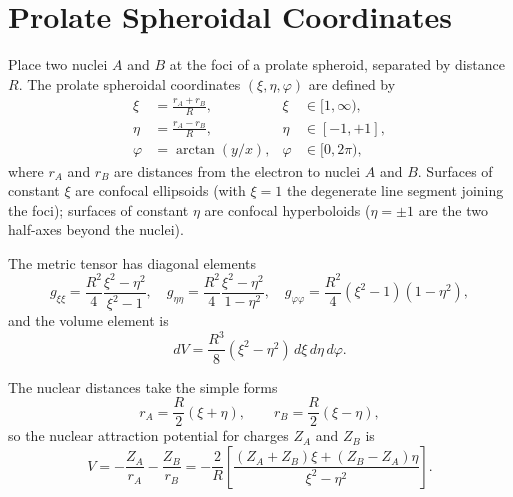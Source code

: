 \documentclass[aps,pra,twocolumn,superscriptaddress,longbibliography]{revtex4-2}
\begin{document}

\section{Prolate Spheroidal Coordinates}
\label{sec:coords}

Place two nuclei $A$ and $B$ at the foci of a prolate spheroid,
separated by distance $R$.  The prolate spheroidal coordinates
$(\xi, \eta, \varphi)$ are defined by
\begin{align}
  \xi  &= \frac{r_A + r_B}{R}, & \xi &\in [1, \infty), \label{eq:xi_def} \\
  \eta &= \frac{r_A - r_B}{R}, & \eta &\in [-1, +1], \label{eq:eta_def} \\
  \varphi &= \arctan(y/x),     & \varphi &\in [0, 2\pi), \label{eq:phi_def}
\end{align}
where $r_A$ and $r_B$ are distances from the electron to nuclei $A$
and $B$.  Surfaces of constant $\xi$ are confocal ellipsoids (with
$\xi = 1$ the degenerate line segment joining the foci); surfaces
of constant $\eta$ are confocal hyperboloids ($\eta = \pm 1$ are
the two half-axes beyond the nuclei).

The metric tensor has diagonal elements
\begin{equation}
  g_{\xi\xi} = \frac{R^2}{4} \frac{\xi^2 - \eta^2}{\xi^2 - 1},
  \quad
  g_{\eta\eta} = \frac{R^2}{4} \frac{\xi^2 - \eta^2}{1 - \eta^2},
  \quad
  g_{\varphi\varphi} = \frac{R^2}{4}(\xi^2 - 1)(1 - \eta^2),
  \label{eq:metric}
\end{equation}
and the volume element is
\begin{equation}
  dV = \frac{R^3}{8}(\xi^2 - \eta^2)\,d\xi\,d\eta\,d\varphi.
  \label{eq:volume}
\end{equation}

The nuclear distances take the simple forms
\begin{equation}
  r_A = \frac{R}{2}(\xi + \eta), \qquad
  r_B = \frac{R}{2}(\xi - \eta),
  \label{eq:nuclear_distances}
\end{equation}
so the nuclear attraction potential for charges $Z_A$ and $Z_B$ is
\begin{equation}
  V = -\frac{Z_A}{r_A} - \frac{Z_B}{r_B}
    = -\frac{2}{R}\left[
        \frac{(Z_A + Z_B)\xi + (Z_B - Z_A)\eta}{\xi^2 - \eta^2}
      \right].
  \label{eq:potential}
\end{equation}
\end{document}
